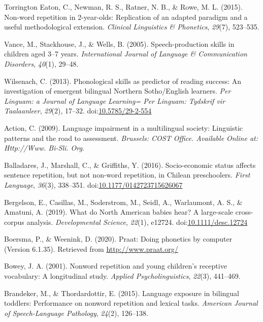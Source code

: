 \documentclass[english,,man,floatsintext]{apa6}
\begin{document}
\hypertarget{ref-torrington2015non}{}
Torrington Eaton, C., Newman, R. S., Ratner, N. B., \& Rowe, M. L.
(2015). Non-word repetition in 2-year-olds: Replication of an adapted
paradigm and a useful methodological extension. \emph{Clinical
Linguistics \& Phonetics}, \emph{29}(7), 523--535.

\hypertarget{ref-vance2005speech}{}
Vance, M., Stackhouse, J., \& Wells, B. (2005). Speech-production skills
in children aged 3--7 years. \emph{International Journal of Language \&
Communication Disorders}, \emph{40}(1), 29--48.

\hypertarget{ref-wilsenach2013phonological}{}
Wilsenach, C. (2013). Phonological skills as predictor of reading
success: An investigation of emergent bilingual Northern Sotho/English
learners. \emph{Per Linguam: a Journal of Language Learning= Per
Linguam: Tydskrif vir Taalaanleer}, \emph{29}(2), 17--32.
doi:\href{https://doi.org/10.5785/29-2-554}{10.5785/29-2-554}

\hypertarget{ref-is08042009language}{}
Action, C. (2009). Language impairment in a multilingual society:
Linguistic patterns and the road to assessment. \emph{Brussels: COST
Office. Available Online at: Http://Www. Bi-Sli. Org}.

\hypertarget{ref-balladares2016socio}{}
Balladares, J., Marshall, C., \& Griffiths, Y. (2016). Socio-economic
status affects sentence repetition, but not non-word repetition, in
Chilean preschoolers. \emph{First Language}, \emph{36}(3), 338--351.
doi:\href{https://doi.org/10.1177/0142723715626067}{10.1177/0142723715626067}

\hypertarget{ref-bergelsoncasillas2019what}{}
Bergelson, E., Casillas, M., Soderstrom, M., Seidl, A., Warlaumont, A.
S., \& Amatuni, A. (2019). What do North American babies hear? A
large-scale cross-corpus analysis. \emph{Developmental Science},
\emph{22}(1), e12724.
doi:\href{https://doi.org/10.1111/desc.12724}{10.1111/desc.12724}

\hypertarget{ref-Praat}{}
Boersma, P., \& Weenink, D. (2020). Praat: Doing phonetics by computer
(Version 6.1.35). Retrieved from \url{http://www.praat.org/}

\hypertarget{ref-bowey2001nonword}{}
Bowey, J. A. (2001). Nonword repetition and young children's receptive
vocabulary: A longitudinal study. \emph{Applied Psycholinguistics},
\emph{22}(3), 441--469.

\hypertarget{ref-brandeker2015language}{}
Brandeker, M., \& Thordardottir, E. (2015). Language exposure in
bilingual toddlers: Performance on nonword repetition and lexical tasks.
\emph{American Journal of Speech-Language Pathology}, \emph{24}(2),
126--138.
\end{document}
